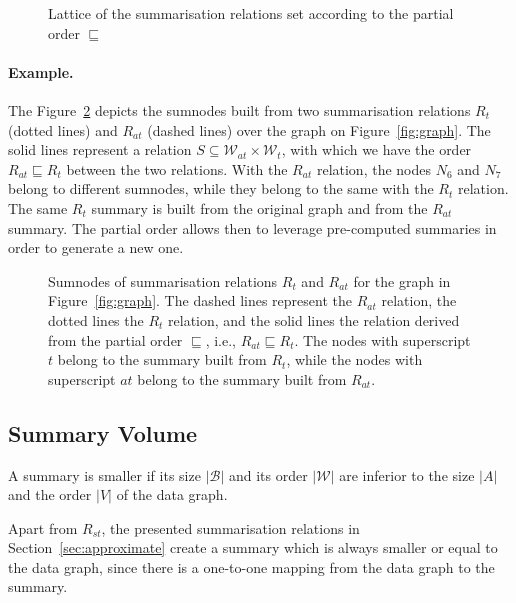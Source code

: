 \begin{figure}
	\centering
	
	\caption{Lattice of the summarisation relations set according to the partial order $\sqsubseteq$}
	\label{fig:lattice}
\end{figure}

\paragraph{Example.}

The Figure~\ref{fig:rel-order} depicts the sumnodes built from two summarisation relations $R_t$ (dotted lines) and $R_{at}$ (dashed lines) over the graph on Figure~\ref{fig:graph}. The solid lines represent a relation $S \subseteq \mathcal{W}_{at} \times \mathcal{W}_t$, with which we have the order $R_{at} \sqsubseteq R_t$ between the two relations. With the $R_{at}$ relation, the nodes $N_6$ and $N_7$ belong to different sumnodes, while they belong to the same with the $R_t$ relation. The same $R_t$ summary is built from the original graph and from the $R_{at}$ summary. The partial order allows then to leverage pre-computed summaries in order to generate a new one.

\begin{figure}
	\centering
	
	\caption{Sumnodes of summarisation relations $R_t$ and $R_{at}$ for the graph in Figure~\ref{fig:graph}. The dashed lines represent the $R_{at}$ relation, the dotted lines the $R_t$ relation, and the solid lines the relation derived from the partial order $\sqsubseteq$, i.e., $R_{at} \sqsubseteq R_t$. The nodes with superscript $t$ belong to the summary built from $R_t$, while the nodes with superscript $at$ belong to the summary built from $R_{at}$.}
	\label{fig:rel-order}
\end{figure}

\subsection{Summary Volume}

A summary is smaller if its size $\vert \mathcal{B} \vert$ and its order $\vert \mathcal{W} \vert$ are inferior to the size $\vert A \vert$ and the order $\vert V \vert$ of the data graph.

Apart from $R_{st}$, the presented summarisation relations in Section~\ref{sec:approximate} create a summary which is always smaller or equal to the data graph, since there is a one-to-one mapping from the data graph to the summary.


